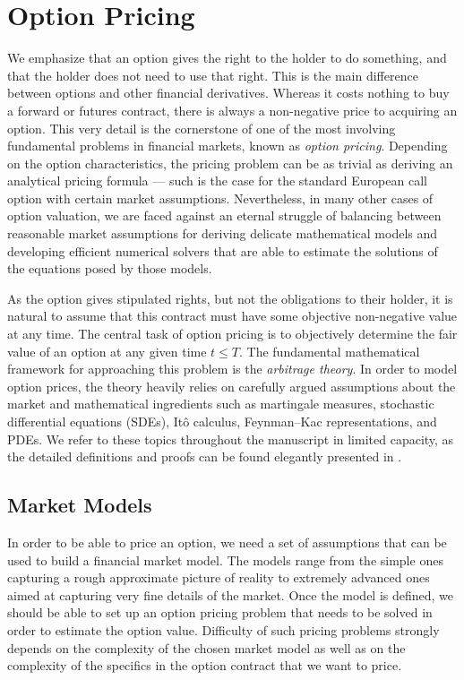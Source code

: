 \documentclass{UUThesisTemplate}
\begin{document}
\chapter{Option Pricing}
\label{ch:optionpricing}
\par We emphasize that an option gives the right to the holder to do something, and that the holder does not need to use that right. This is the main difference between options and other financial derivatives. Whereas it costs nothing to buy a forward or futures contract, there is always a non-negative price to acquiring an option. This very detail is the cornerstone of one of the most involving fundamental problems in financial markets, known as \emph{option pricing}. Depending on the option characteristics, the pricing problem can be as trivial as deriving an analytical pricing formula --- such is the case for the standard European call option with certain market assumptions. Nevertheless, in many other cases of option valuation, we are faced against an eternal struggle of balancing between reasonable market assumptions for deriving delicate mathematical models and developing efficient numerical solvers that are able to estimate the solutions of the equations posed by those models.
\par As the option gives stipulated rights, but not the obligations to their holder, it is natural to assume that this contract must have some objective non-negative value at any time. The central task of option pricing is to objectively determine the fair value of an option at any given time $t \leq T$. The fundamental mathematical framework for approaching this problem is the \emph{arbitrage theory}. In order to model option prices, the theory heavily relies on carefully argued assumptions about the market and mathematical ingredients such as martingale measures, stochastic differential equations (SDEs), It\^o calculus, Feynman--Kac representations, and PDEs. We refer to these topics throughout the manuscript in limited capacity, as the detailed definitions and proofs can be found elegantly presented in \cite{bjork2009arbitrage}.
%
\section{Market Models}
\label{sec:models}
\par In order to be able to price an option, we need a set of assumptions that can be used to build a financial market model. The models range from the simple ones capturing a rough approximate picture of reality to extremely advanced ones aimed at capturing very fine details of the market. Once the model is defined, we should be able to set up an option pricing problem that needs to be solved in order to estimate the option value. Difficulty of such pricing problems strongly depends on the complexity of the chosen market model as well as on the complexity of the specifics in the option contract that we want to price.  
%
\end{document}
